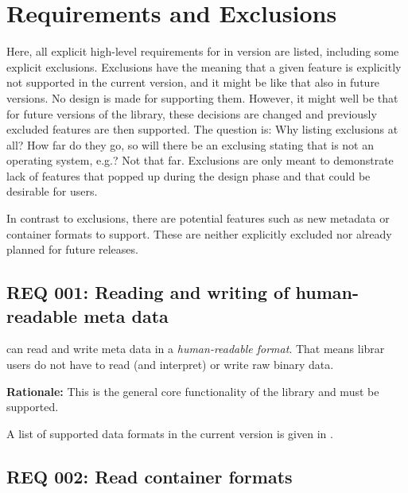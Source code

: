 \chapter{Requirements and Exclusions}
\label{sec:Requirements}

Here, all explicit high-level requirements for \LibName{} in version \LibVersion{} are listed, including some explicit exclusions. Exclusions have the meaning that a given feature is explicitly not supported in the current version, and it might be like that also in future versions. No design is made for supporting them. However, it might well be that for future versions of the library, these decisions are changed and previously excluded features are then supported. The question is: Why listing exclusions at all? How far do they go, so will there be an exclusing stating that \LibName{} is not an operating system, e.g.? Not that far. Exclusions are only meant to demonstrate lack of features that popped up during the design phase and that could be desirable for \LibName{} users.

In contrast to exclusions, there are potential features such as new metadata or container formats to support. These are neither explicitly excluded nor already planned for future releases.


\section{REQ 001: Reading and writing of human-readable meta data}
\label{sec:MetadatenLesenUndSchreiben}

\LibName{} can read and write meta data in a \emph{human-readable format}. That means librar users do not have to read (and interpret) or write raw binary data. 

\textbf{Rationale:} This is the general core functionality of the library and must be supported.

A list of supported data formats in the current version is given in .


\section{REQ 002: Read container formats}
\label{sec:REQ002ContainerformateLesen}

